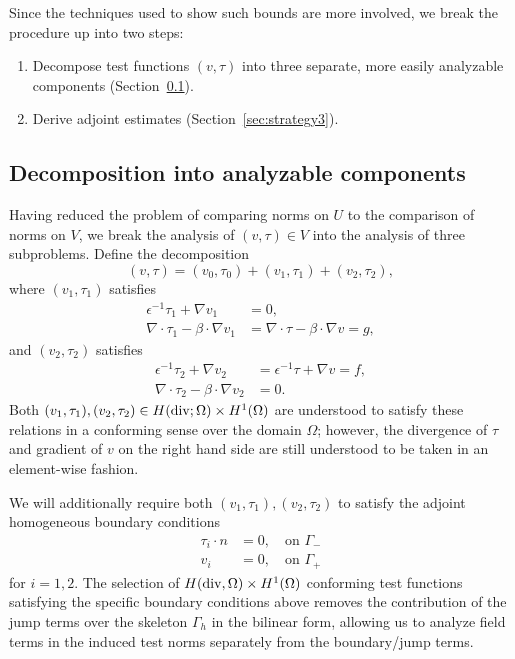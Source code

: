 \documentclass[11pt,onecolumn]{scrartcl}
\newcommand{\Gh}{\Gamma_h}
\newcommand{\grad}{\nabla}
\renewcommand{\div}{\grad \cdot}
\begin{document}
Since the techniques used to show such bounds are more involved, we break the procedure up into two steps:
\begin{enumerate}
\item{}Decompose test functions $(v,\tau)$ into three separate, more easily analyzable components (Section~\ref{sec:strategy2}).
\item{}Derive adjoint estimates (Section~\ref{sec:strategy3}).
\end{enumerate}

\subsection{Decomposition into analyzable components}
\label{sec:strategy2}

Having reduced the problem of comparing norms on $U$ to the comparison of norms on $V$, we break the analysis of $\left(v,\tau\right) \in V$ into the analysis of three subproblems.  Define the decomposition
\[
\left(v,\tau\right) = \left(v_0,\tau_0\right) + \left(v_1,\tau_1\right) + \left(v_2,\tau_2\right),
\]
where $\left(v_1,\tau_1\right)$ satisfies 
\begin{align*}
\epsilon^{-1}\tau_1 + \grad v_1 &= 0 ,\\
\div \tau_1 - \beta\cdot \grad v_1 &=  \div \tau - \beta\cdot \grad v = g, 
\end{align*} 
and $\left(v_2,\tau_2\right)$ satisfies
\begin{align*}
\epsilon^{-1}\tau_2 + \grad v_2 &= \epsilon^{-1}\tau + \grad v = f, \\
\div \tau_2 - \beta\cdot \grad v_2 &= 0.
\end{align*}
Both $(v_1,\tau_1), (v_2,\tau_2) \in H({\rm div}; \Omega)\times H^1(\Omega)$ are understood to satisfy these relations in a conforming sense over the domain $\Omega$; however, the divergence of $\tau$ and gradient of $v$ on the right hand side are still understood to be taken in an element-wise fashion. 

We will additionally require both $\left(v_1,\tau_1\right), \left(v_2,\tau_2\right)$ to satisfy the adjoint homogeneous boundary conditions
\begin{align}
\tau_i\cdot n &= 0, \quad \text{on }\Gamma_- \label{bc_1}\\
v_i &= 0, \quad \text{on } \Gamma_+ \label{bc_2}
\end{align}
for $i = 1, 2$. The selection of $H({\rm div}, \Omega)\times H^1(\Omega)$ conforming test functions satisfying the specific boundary conditions above removes the contribution of the jump terms over the skeleton $\Gh$ in the bilinear form, allowing us to analyze field terms in the induced test norms separately from  the boundary/jump terms. 
\end{document}

